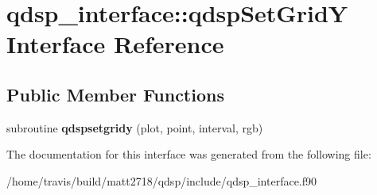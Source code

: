 \hypertarget{interfaceqdsp__interface_1_1qdspSetGridY}{\section{qdsp\-\_\-interface\-:\-:qdsp\-Set\-Grid\-Y Interface Reference}
\label{interfaceqdsp__interface_1_1qdspSetGridY}
}
\subsection*{Public Member Functions}
\begin{DoxyCompactItemize}
\item 
\hypertarget{interfaceqdsp__interface_1_1qdspSetGridY_a5c2b12fb142dd96bcb869645766bfb0d}{subroutine {\bfseries qdspsetgridy} (plot, point, interval, rgb)}\label{interfaceqdsp__interface_1_1qdspSetGridY_a5c2b12fb142dd96bcb869645766bfb0d}

\end{DoxyCompactItemize}


The documentation for this interface was generated from the following file\-:\begin{DoxyCompactItemize}
\item 
/home/travis/build/matt2718/qdsp/include/qdsp\-\_\-interface.\-f90\end{DoxyCompactItemize}
